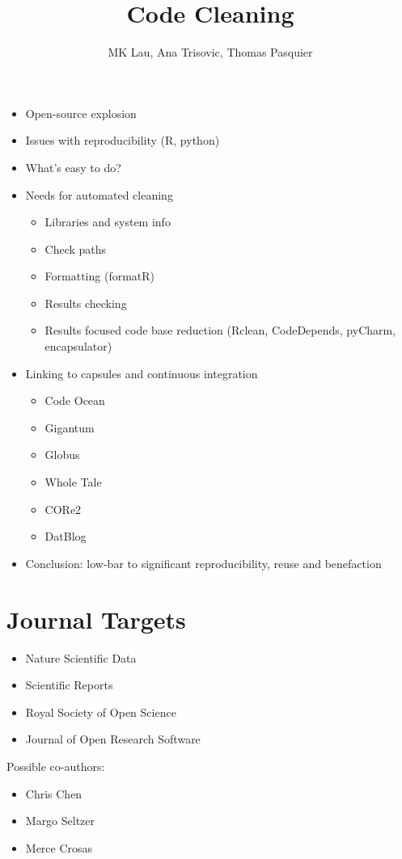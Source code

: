 \documentclass{article}
\title{Code Cleaning}
\author{MK Lau, Ana Trisovic, Thomas Pasquier}
\begin{document}
\maketitle

\begin{itemize}
\item Open-source explosion
\item Issues with reproducibility (R, python)
\item What's easy to do?
\item Needs for automated cleaning
  \begin{itemize}
  \item Libraries and system info
  \item Check paths
  \item Formatting (formatR)
  \item Results checking
  \item Results focused code base reduction (Rclean, CodeDepends,
    pyCharm, encapsulator)
  \end{itemize}
\item Linking to capsules and continuous integration
  \begin{itemize}
  \item Code Ocean
  \item Gigantum
  \item Globus
  \item Whole Tale
  \item CORe2
  \item DatBlog
  \end{itemize}
\item Conclusion: low-bar to significant reproducibility, reuse and benefaction
\end{itemize}

\section*{Journal Targets}

\begin{itemize}
\item Nature Scientific Data
\item Scientific Reports
\item Royal Society of Open Science
\item Journal of Open Research Software
\end{itemize}

Possible co-authors:

\begin{itemize}
\item Chris Chen
\item Margo Seltzer
\item Merce Crosas
\end{itemize}
\end{document}
